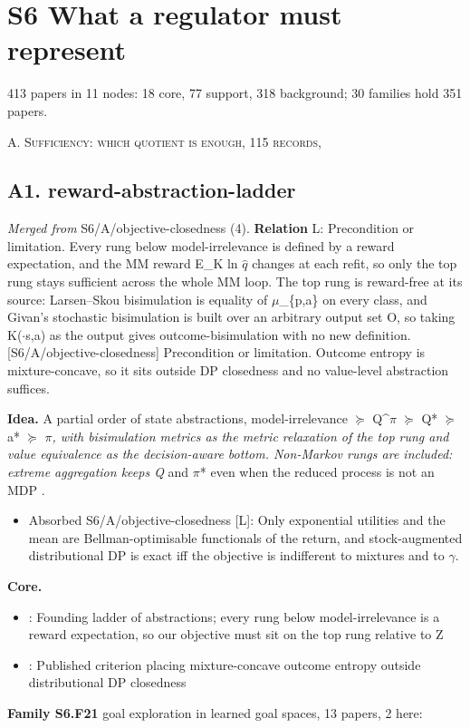 \documentclass[10pt]{article}
\newcommand{\memb}[1]{\par\smallskip\textbf{#1}\quad}
\begin{document}
\section{S6 What a regulator must represent}
413 papers in 11 nodes: 18 core, 77 support, 318 background; 30 families hold 351 papers.

\medskip\textsc{A. Sufficiency: which quotient is enough, 115 records,}

\subsection{A1. reward-abstraction-ladder}\label{node:S6-S6-A-reward-abstraction-ladder}
\textit{Merged from} S6/A/objective-closedness (4). \textbf{Relation} \textsf{L}: Precondition or limitation. Every rung below model-irrelevance is defined by a reward expectation, and the MM reward E\_K ln \ensuremath{\hat{q}} changes at each refit, so only the top rung stays sufficient across the whole MM loop. The top rung is reward-free at its source: Larsen--Skou bisimulation is equality of \ensuremath{\mu}\_\{p,a\} on every class, and Givan's stochastic bisimulation is built over an arbitrary output set O, so taking K(\ensuremath{\cdot}\textbar{}s,a) as the output gives outcome-bisimulation with no new definition. [S6/A/objective-closedness] Precondition or limitation. Outcome entropy is mixture-concave, so it sits outside DP closedness and no value-level abstraction suffices.

\textbf{Idea.} A partial order of state abstractions, model-irrelevance \ensuremath{\succeq} Q\^{}\ensuremath{\pi} \ensuremath{\succeq} Q* \ensuremath{\succeq} a* \ensuremath{\succeq} \ensuremath{\pi}\emph{, with bisimulation metrics as the metric relaxation of the top rung and value equivalence as the decision-aware bottom. Non-Markov rungs are included: extreme aggregation keeps Q} and \ensuremath{\pi}* even when the reduced process is not an MDP \citep{Hutter-extreme14,Majeed-performance18}.
\begin{itemize}[nosep,leftmargin=1.2em]
\item Absorbed S6/A/objective-closedness [L]: Only exponential utilities and the mean are Bellman-optimisable functionals of the return, and stock-augmented distributional DP is exact iff the objective is indifferent to mixtures and to \ensuremath{\gamma}.
\end{itemize}


\memb{Core.}
\begin{itemize}[nosep,leftmargin=1.2em]
\item \citet{Li-towards06}: Founding ladder of abstractions; every rung below model-irrelevance is a reward expectation, so our objective must sit on the top rung relative to Z
\item \citet{AvilaPires-optimizing25}: Published criterion placing mixture-concave outcome entropy outside distributional DP closedness
\end{itemize}
\memb{Family S6.F21} goal exploration in learned goal spaces, 13 papers, 2 here: {\footnotesize \citetext{\citealp{Park-dual25}; \citealp{Ghosh-learning18}}}
\end{document}
